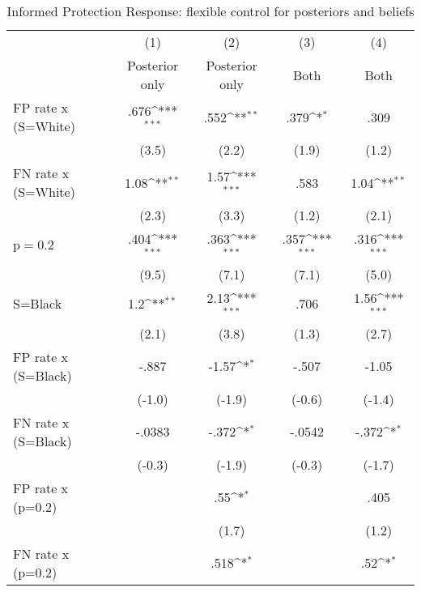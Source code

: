 \begin{table}[htbp]\centering
\def\sym#1{\ifmmode^{#1}\else\(^{#1}\)\fi}
\caption{Informed Protection Response: flexible control for posteriors and beliefs}
\begin{tabular}{l*{4}{c}}
\hline\hline
                &\multicolumn{1}{c}{(1)}&\multicolumn{1}{c}{(2)}&\multicolumn{1}{c}{(3)}&\multicolumn{1}{c}{(4)}\\
                &\multicolumn{1}{c}{Posterior only}&\multicolumn{1}{c}{Posterior only}&\multicolumn{1}{c}{Both}&\multicolumn{1}{c}{Both}\\
\hline
FP rate x (S=White)&     .676\sym{***}&     .552\sym{**} &     .379\sym{*}  &     .309         \\
                &    (3.5)         &    (2.2)         &    (1.9)         &    (1.2)         \\
FN rate x (S=White)&     1.08\sym{**} &     1.57\sym{***}&     .583         &     1.04\sym{**} \\
                &    (2.3)         &    (3.3)         &    (1.2)         &    (2.1)         \\
p$=$0.2         &     .404\sym{***}&     .363\sym{***}&     .357\sym{***}&     .316\sym{***}\\
                &    (9.5)         &    (7.1)         &    (7.1)         &    (5.0)         \\
S=Black         &      1.2\sym{**} &     2.13\sym{***}&     .706         &     1.56\sym{***}\\
                &    (2.1)         &    (3.8)         &    (1.3)         &    (2.7)         \\
FP rate x (S=Black)&    -.887         &    -1.57\sym{*}  &    -.507         &    -1.05         \\
                &   (-1.0)         &   (-1.9)         &   (-0.6)         &   (-1.4)         \\
FN rate x (S=Black)&   -.0383         &    -.372\sym{*}  &   -.0542         &    -.372\sym{*}  \\
                &   (-0.3)         &   (-1.9)         &   (-0.3)         &   (-1.7)         \\
FP rate x (p=0.2)&                  &      .55\sym{*}  &                  &     .405         \\
                &                  &    (1.7)         &                  &    (1.2)         \\
FN rate x (p=0.2)&                  &     .518\sym{*}  &                  &      .52\sym{*}  \\

\end{tabular}
\end{table}
